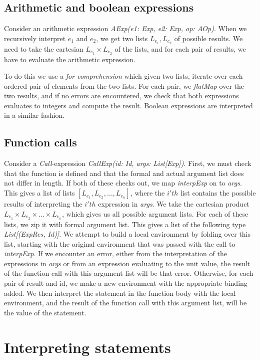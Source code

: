 \subsection{Arithmetic and boolean expressions}
Consider an arithmetic expression 
\textsl{AExp(e1: Exp, e2: Exp, op: AOp)}. When we recursively interpret $e_1$ and $e_2$, we get two lists $L_{e_1}, L_{e_2}$ of possible results. We need to take the cartesian $L_{e_1} \times L_{e_2}$ of the lists, and for each pair of results, we have to evaluate the arithmetic expression. 

To do this we use a \textsl{for-comprehension} which given two lists, iterate over each ordered pair of elements from the two lists.  For each pair, we \textsl{flatMap} over the two results, and if no errors are encountered, we check that both expressions evaluates to integers and compute the result.
Boolean expressions are interpreted in a similar fashion.

\subsection{Function calls}
Consider a \textsl{Call}-expression \textsl{CallExp(id: Id, args: List[Exp])}.
First, we must check that the function is defined and that the formal and actual argument list does not differ in length. If both of these checks out, we map \textsl{interpExp} on to \textsl{args}. This gives a list of lists $[L_{e_1}, L_{e_2}, \ldots, L_{e_n}]$, where the $i'th$ list contains the possible results of interpreting the $i'th$ expression in \textsl{args}.
We take the cartesian product $L_{e_1} \times L_{e_2} \times \ldots \times L_{e_n}$, which gives us all possible argument lists. For each of these lists, we zip it with formal argument list. This gives a list of the following type \textsl{List[(ExpRes, Id)]}. We attempt to build a local environment by folding over this list, starting with the original environment that was passed with the call to \textsl{interpExp}. If we encounter an error, either from the interpretation of the expressions in \textsl{args} or from an expression evaluating to the unit value, the result of the function call with this argument list will be that error. Otherwise, for each pair of result and id, we make a new environment with the appropriate binding added. We then interpret the statement in the function body  with the local environment, and the result of the function call with this argument list, will be the value of the statement. 

\section{Interpreting statements}

